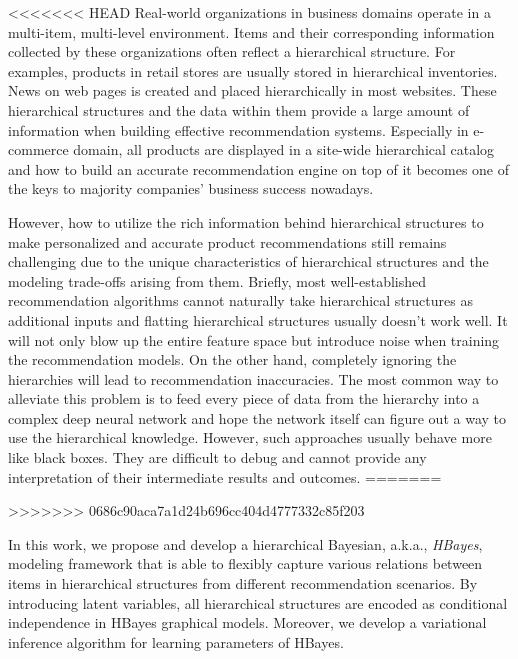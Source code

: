 <<<<<<< HEAD
Real-world organizations in business domains operate in a multi-item, multi-level environment. Items and their corresponding information collected by these organizations often reflect a hierarchical structure. For examples, products in retail stores are usually stored in hierarchical inventories. News on web pages is created and placed hierarchically in most websites. These hierarchical structures and the data within them provide a large amount of information when building effective recommendation systems. Especially in e-commerce domain, all products are displayed in a site-wide hierarchical catalog and how to build an accurate recommendation engine on top of it becomes one of the keys to majority companies' business success nowadays. 

However, how to utilize the rich information behind hierarchical structures to make personalized and accurate product recommendations still remains challenging due to the unique characteristics of hierarchical structures and the modeling trade-offs arising from them. Briefly, most well-established recommendation algorithms cannot naturally take hierarchical structures as additional inputs and flatting hierarchical structures usually doesn't work well. It will not only blow up the entire feature space but introduce noise when training the recommendation models. On the other hand, completely ignoring the hierarchies will lead to recommendation inaccuracies. The most common way to alleviate this problem is to feed every piece of data from the hierarchy into a complex deep neural network and hope the network itself can figure out a way to use the hierarchical knowledge. However, such approaches usually behave more like black boxes. They are difficult to debug and cannot provide any interpretation of their intermediate results and outcomes.
=======

>>>>>>> 0686c90aca7a1d24b696cc404d4777332c85f203

In this work, we propose and develop a hierarchical Bayesian, a.k.a., \emph{HBayes}, modeling framework that is able to flexibly capture various relations between items in hierarchical structures from different recommendation scenarios. By introducing latent variables, all hierarchical structures are encoded as conditional independence in HBayes graphical models. Moreover, we develop a variational inference algorithm for learning parameters of HBayes. 

